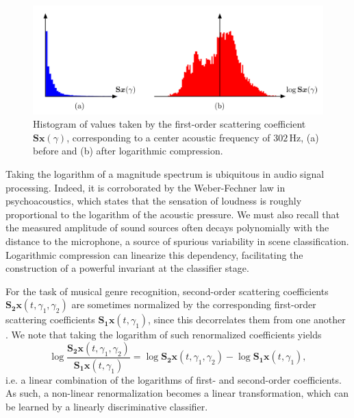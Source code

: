 \documentclass[journal]{IEEEtran}
\makeatletter
\newcommand*{\ie}{i.e.\@\xspace}
\makeatother
\begin{document}
\begin{figure}
\begin{center}
\includegraphics[width=\columnwidth]{compression.png}
\caption{
\label{fig:histograms}
Histogram of values taken by the first-order scattering coefficient $\mathbf{S}\boldsymbol{x}(\gamma)$, corresponding to a center acoustic frequency of $302\,\mathrm{Hz}$,
(a) before and (b) after logarithmic compression.}
\label{fig:compression}
\end{center}
\end{figure}


Taking the logarithm of a magnitude spectrum is ubiquitous in audio signal processing.
Indeed, it is corroborated by the Weber-Fechner law in psychoacoustics, which states that the sensation of loudness is roughly proportional to the logarithm of the acoustic pressure. 
We must also recall that the measured amplitude of sound sources often decays polynomially with the distance to the microphone, a source of spurious variability in scene classification.
Logarithmic compression can linearize this dependency, facilitating the construction of a powerful invariant at the classifier stage.

For the task of musical genre recognition, second-order scattering coefficients $\mathbf{S_2}\boldsymbol{x}(t,\gamma_1,\gamma_2)$ are sometimes normalized by the corresponding first-order scattering coefficients $\mathbf{S_1}\boldsymbol{x}(t,\gamma_1)$, since this decorrelates them from one another \cite{Anden2014}.
We note that taking the logarithm of such renormalized coefficients yields
\begin{equation}
\log \dfrac{\mathbf{S_2}\boldsymbol{x}(t,\gamma_1,\gamma_2)}{\mathbf{S_1}\boldsymbol{x}(t,\gamma_1)} =
\log \mathbf{S_2}\boldsymbol{x}(t, \gamma_1, \gamma_2) -
\log \mathbf{S_1}\boldsymbol{x}(t, \gamma_1),
\end{equation}
\ie a linear combination of the logarithms of first- and second-order coefficients.
As such, a non-linear renormalization becomes a linear transformation, which can be learned by a linearly discriminative classifier.
\end{document}
